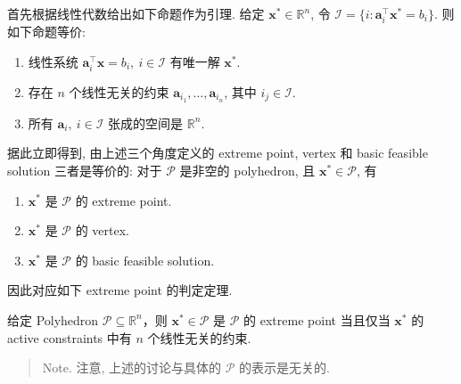 \begin{lemmablock}{}
首先根据线性代数给出如下命题作为引理. 给定 $\bm{x}^* \in \mathbb{R}^n$, 令 $\mathcal{I} = \{i: \bm{a}_i^\top \bm{x}^* = b_i\}$. 则如下命题等价:

\begin{enumerate}
\item {}线性系统 $\bm{a}_i^\top \bm{x} = b_i,~ i \in \mathcal{I}$ 有唯一解 $\bm{x}^*$.


\item {}存在 $n$ 个线性无关的约束 $\bm{a}_{i_1}, \dots, \bm{a}_{i_n}$, 其中 $i_j \in \mathcal{I}$.


\item {}所有 $\bm{a}_i,~ i \in \mathcal{I}$ 张成的空间是 $\mathbb{R}^n$.


\end{enumerate}

\end{lemmablock}


\begin{propositionblock}{}
据此立即得到, 由上述三个角度定义的 extreme point, vertex 和 basic feasible solution 三者是等价的: 对于 $\mathcal{P}$ 是非空的 polyhedron, 且 $\bm{x}^* \in \mathcal{P}$, 有

\begin{enumerate}
\item {}$\bm{x}^*$ 是 $\mathcal{P}$ 的 extreme point.


\item {}$\bm{x}^*$ 是 $\mathcal{P}$ 的 vertex.


\item {}$\bm{x}^*$ 是 $\mathcal{P}$ 的 basic feasible solution.


\end{enumerate}

\end{propositionblock}

因此对应如下 extreme point 的判定定理.


\begin{thmblock}
给定 Polyhedron $\mathcal{P} \subseteq \mathbb{R}^n$，则 $\bm{x}^* \in \mathcal{P}$ 是 $\mathcal{P}$ 的 extreme point 当且仅当 $\bm{x}^*$ 的 active constraints 中有 $n$ 个线性无关的约束.

\end{thmblock}

\begin{quote}
Note.
注意, 上述的讨论与具体的 $\mathcal{P}$ 的表示是无关的.

\end{quote}

